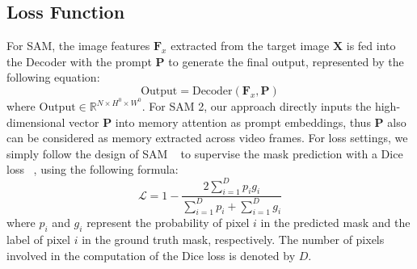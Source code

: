 \subsection{Loss Function}
\label{sec:SAM 2andSAM}
For SAM, the image features \(\mathbf{F}_x\) extracted from the target image \(\mathbf{X}\) is fed into the Decoder with the prompt \(\mathbf{P}\) to generate the final output, represented by the following equation:
\begin{equation}
\text{Output} = \text{Decoder}(\mathbf{F}_x, \mathbf{P})
\end{equation}
where \(\text{Output} \in \mathbb{R}^{N \times H^0 \times W^0}\). For SAM 2, our approach directly inputs the high-dimensional vector \(\mathbf{P}\) into memory attention as prompt embeddings, thus \(\mathbf{P}\) also can be considered as memory extracted across video frames. For loss settings, we simply follow the design of SAM ~\cite{kirillov2023segment} to supervise the mask prediction with a Dice loss ~\cite{milletari2016v}, using the following formula:
\begin{equation}
\mathcal{L} = 1 - \frac{2 \sum_{i=1}^{D} p_i g_i}{\sum_{i=1}^{D} p_i + \sum_{i=1}^{D} g_i}
\end{equation}
where \(p_i\) and \(g_i\) represent the probability of pixel \(i\) in the predicted mask and the label of pixel \(i\) in the ground truth mask, respectively. The number of pixels involved in the computation of the Dice loss is denoted by \(D\).
